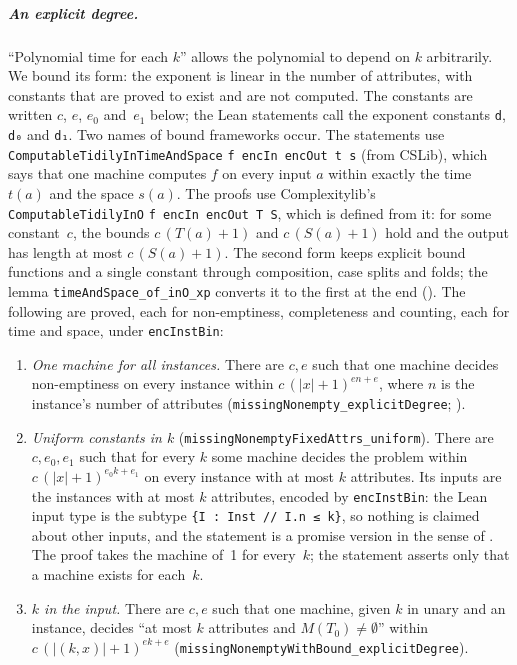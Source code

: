 \documentclass[pdflatex,sn-mathphys-num]{sn-jnl}
\theoremstyle{thmstyleone}
\theoremstyle{thmstylethree}
\begin{document}
\subparagraph*{An explicit degree.}
``Polynomial time for each $k$'' allows the polynomial to depend on $k$ arbitrarily. We bound
its form: the exponent is linear in the number of attributes, with constants that are proved to
exist and are not computed. The constants are written $c$, $e$, $e_0$ and~$e_1$ below; the Lean
statements call the exponent constants \lstinline{d}, \lstinline{d₀} and \lstinline{d₁}. Two
names of bound frameworks occur. The statements use \lstinline{ComputableTidilyInTimeAndSpace}
\lstinline{f encIn encOut t s} (from CSLib), which says that one machine computes $f$ on every input $a$
within exactly the time $t(a)$ and the space $s(a)$. The proofs use Complexitylib's
\lstinline{ComputableTidilyInO} \lstinline{f encIn encOut T S}, which is defined from it: for some
constant~$c$, the bounds $c\,(T(a)+1)$ and $c\,(S(a)+1)$ hold and the output has length at most
$c\,(S(a)+1)$. The second form keeps explicit bound functions and a single constant through
composition, case splits and folds; the lemma \lstinline{timeAndSpace_of_inO_xp} converts it to
the first at the end (). The following are proved, each for
non-emptiness, completeness and counting, each for time and space, under
\lstinline{encInstBin}:
\begin{enumerate}
\item \emph{One machine for all instances.} There are $c, e$ such that one machine decides
  non-emptiness on every instance within $c\,(|x|+1)^{en+e}$, where $n$ is the instance's number
  of attributes (\lstinline{missingNonempty_explicitDegree}; ).
\item \emph{Uniform constants in $k$} (\lstinline{missingNonemptyFixedAttrs_uniform}). There are
  $c, e_0, e_1$ such that for every $k$ some machine decides the problem within
  $c\,(|x|+1)^{e_0 k + e_1}$ on every instance with at most $k$ attributes. Its inputs are the
  instances with at most $k$ attributes, encoded by \lstinline{encInstBin}: the Lean input type
  is the subtype \lstinline|{I : Inst // I.n ≤ k}|, so nothing is claimed about other inputs,
  and the statement is a promise version in the sense of . The proof takes the
  machine of~1 for every~$k$; the statement asserts only that a machine exists for each~$k$.
\item \emph{$k$ in the input.} There are $c, e$ such that one machine, given $k$ in unary and an
  instance, decides ``at most $k$ attributes and $M(T_0) \neq \emptyset$'' within
  $c\,(|(k,x)|+1)^{ek+e}$ (\lstinline{missingNonemptyWithBound_explicitDegree}).
\end{enumerate}
\end{document}
